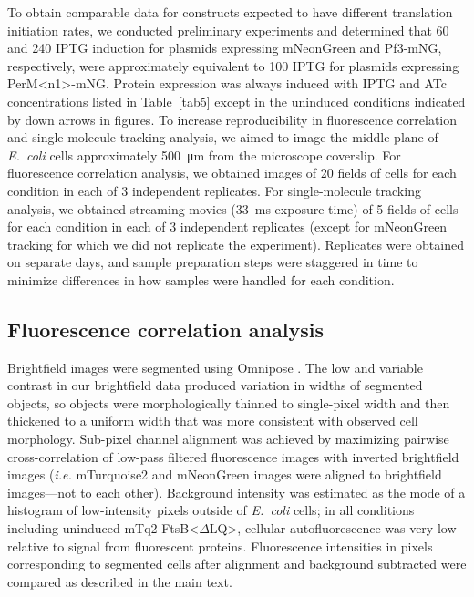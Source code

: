 \documentclass[twocolumn,pdflatex,sn-nature]{sn-jnl}%
\def\textsuperscript#1{<#1>}%
\newcommand\ec{\textit{E.~coli}}
\newcommand\ftsbdLQ{FtsB\textsuperscript{$\Delta{}$LQ}}
\newcommand\permN{PerM\textsuperscript{n1}}
\begin{document}
To obtain comparable data for constructs expected to have different translation initiation rates, we conducted preliminary experiments and determined that \qty{60}{\uM} and \qty{240}{\uM} IPTG induction for plasmids expressing mNeonGreen and Pf3-mNG, respectively, were approximately equivalent to \qty{100}{\uM} IPTG for plasmids expressing \permN{}-mNG.
Protein expression was always induced with IPTG and ATc concentrations listed in Table~\ref{tab5} except in the uninduced conditions indicated by down arrows in figures.
To increase reproducibility in fluorescence correlation and single-molecule tracking analysis, we aimed to image the middle plane of \ec{} cells approximately \qty{500}{\um} from the microscope coverslip.
For fluorescence correlation analysis, we obtained images of 20 fields of cells for each condition in each of 3 independent replicates.
For single-molecule tracking analysis, we obtained streaming movies (\qty{33}{\ms} exposure time) of 5 fields of cells for each condition in each of 3 independent replicates (except for mNeonGreen tracking for which we did not replicate the experiment).
Replicates were obtained on separate days, and sample preparation steps were staggered in time to minimize differences in how samples were handled for each condition.

\subsection{Fluorescence correlation analysis}

Brightfield images were segmented using Omnipose \citep{cutlerOmniposeHighprecisionMorphologyindependent2022}.
The low and variable contrast in our brightfield data produced variation in widths of segmented objects, so objects were morphologically thinned to single-pixel width and then thickened to a uniform width that was more consistent with observed cell morphology.
Sub-pixel channel alignment was achieved by maximizing pairwise cross-correlation of low-pass filtered fluorescence images with inverted brightfield images (\textit{i.e.} mTurquoise2 and mNeonGreen images were aligned to brightfield images---not to each other).
Background intensity was estimated as the mode of a histogram of low-intensity pixels outside of \ec{} cells; in all conditions including uninduced mTq2-\ftsbdLQ{}, cellular autofluorescence was very low relative to signal from fluorescent proteins.
Fluorescence intensities in pixels corresponding to segmented cells after alignment and background subtracted were compared as described in the main text.
\end{document}

